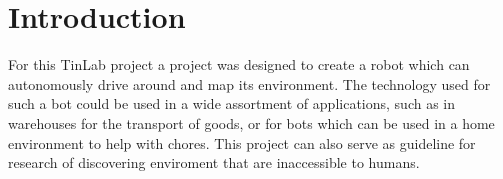 \section{Introduction}
For this TinLab project a project was designed to create a robot which can autonomously drive around and map its environment.
The technology used for such a bot could be used in a wide assortment of applications, such as in warehouses for 
the transport of goods, or for bots which can be used in a home environment to help with chores. This project can also serve as guideline 
for research of discovering enviroment that are inaccessible to humans.




